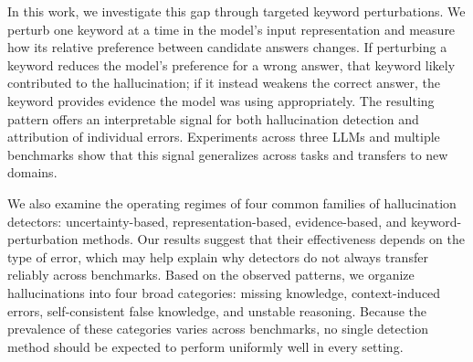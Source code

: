 In this work, we investigate this gap through targeted keyword perturbations.  We perturb one keyword at a time in the model's input representation and measure how its relative preference between candidate answers changes.  If perturbing a keyword reduces the model's preference for a wrong answer, that keyword likely contributed to the hallucination; if it instead weakens the correct answer, the keyword provides evidence the model was using appropriately.  The resulting pattern offers an interpretable signal for both hallucination detection and attribution of individual errors.  Experiments across three LLMs and multiple benchmarks show that this signal generalizes across tasks and transfers to new domains.

We also examine the operating regimes of four common families of hallucination detectors: uncertainty-based, representation-based, evidence-based, and keyword-perturbation methods.  Our results suggest that their effectiveness depends on the type of error, which may help explain why detectors do not always transfer reliably across benchmarks.  Based on the observed patterns, we organize hallucinations into four broad categories: missing knowledge, context-induced errors, self-consistent false knowledge, and unstable reasoning.  Because the prevalence of these categories varies across benchmarks, no single detection method should be expected to perform uniformly well in every setting.


